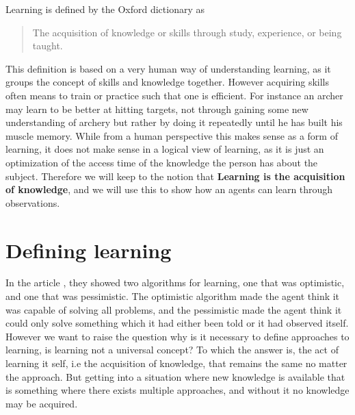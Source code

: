 \documentclass[../Master.tex]{subfiles}
\begin{document}
	
	Learning is defined by the Oxford dictionary as 
	\begin{quote}
		The acquisition of knowledge or skills through study, experience, or being taught.
	\end{quote}
	
	This definition is based on a very human way of understanding learning, as it groups the concept of skills and knowledge together.
	However acquiring skills often means to train or practice such that one is efficient. For instance an archer may learn to be better at hitting targets, 
	not through gaining some new understanding of archery but rather by doing it repeatedly until he has built his muscle memory.
	While from a human perspective this makes sense as a form of learning, 
	it does not make sense in a logical view of learning, as it is just an optimization of the access time of the knowledge the person has about the subject.
	Therefore we will keep to the notion that \textbf{Learning is the acquisition of knowledge}, and we will use this to show how an agents can learn through observations.
	
	\section{Defining learning}
	
	In the article \cite{Walsh2008}, they showed two algorithms for learning, one that was optimistic, and one that was pessimistic. 
	The optimistic algorithm made the agent think it was capable of solving all problems, 
	and the pessimistic made the agent think it could only solve something which it had either been told or it had observed itself. 
	However we want to raise the question why is it necessary to define approaches to learning, is learning not a universal concept?
	To which the answer is, the act of learning it self, i.e the acquisition of knowledge, that remains the same no matter the approach.
	But getting into a situation where new knowledge is available that is something where there exists multiple approaches, and without it no knowledge may be acquired.
	
\end{document}
